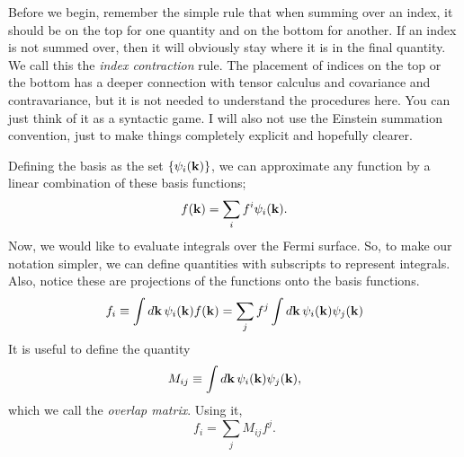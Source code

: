 \documentclass[12pt]{article}
\begin{document}
Before we begin, remember the simple rule that when summing over an index, it should be on the top
for one quantity and on the bottom for another. If an index is not summed over, then it will
obviously stay where it is in the final quantity. We call this the \emph{index contraction} rule.
The placement of indices on the top or the bottom has a deeper connection with tensor calculus and
covariance and contravariance, but it is not needed to understand the procedures here. You can just
think of it as a syntactic game. I will also not use the Einstein summation convention, just to
make things completely explicit and hopefully clearer.

Defining the basis as the set $\{\psi_i(\vb{k})\}$, we can approximate any function by a linear
combination of these basis functions;
\begin{equation}
    f(\vb{k}) = \sum_i f^{i}\psi_i(\vb{k}). \label{eq:vector}
\end{equation}
Now, we would like to evaluate integrals over the Fermi surface. So, to make our notation simpler,
we can define quantities with subscripts to represent integrals. Also, notice these are projections
of the functions onto the basis functions.
\begin{equation}
    f_i \equiv \int\dd{\vb{k}} \psi_i(\vb{k}) f(\vb{k})
    = \sum_j f^j \int\dd{\vb{k}} \psi_i(\vb{k}) \psi_j(\vb{k})
    \label{eq:integral_vector}
\end{equation}
It is useful to define the quantity
\begin{equation}
    M_{ij} \equiv \int \dd{\vb{k}} \psi_i(\vb{k}) \psi_j(\vb{k}),
    \label{eq:overlap}
\end{equation}
which we call the \emph{overlap matrix}. Using it,
\begin{equation}
    f_i = \sum_j M_{ij} f^j.
    \label{eq:lowering_vector}
\end{equation}
\end{document}
